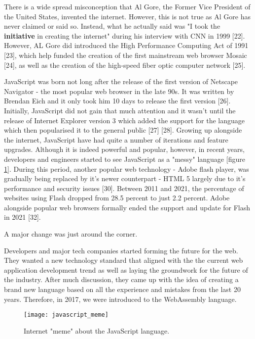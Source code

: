 There is a wide spread misconception that Al Gore, the Former Vice President of the United States, invented the internet. However, this is not true as Al Gore has never claimed or said so. Instead, what he actually said was "I took the \textbf{initiative} in creating the internet" during his interview with CNN in 1999 [22]. However, AL Gore did introduced the High Performance Computing Act of 1991 [23], which help funded the creation of the first mainstream web browser Mosaic [24], as well as the creation of the high-speed fiber optic computer network [25].

JavaScript was born not long after the release of the first version of Netscape Navigator - the most popular web browser in the late 90s. It was written by Brendan Eich and it only took him 10 days to release the first version [26]. Initially, JavaScript did not gain that much attention and it wasn't until the release of Internet Explorer version 3 which added the support for the language which then popularised it to the general public [27] [28]. Growing up alongside the internet, JavaScript have had quite a number of iterations and feature upgrades. Although it is indeed powerful and popular, however, in recent years, developers and engineers started to see JavaScript as a "messy" language [figure \ref{fig:javascript_meme}]. During this period, another popular web technology - Adobe flash player, was gradually being replaced by it's newer counterpart - HTML 5 largely due to it's performance and security issues [30]. Between 2011 and 2021, the percentage of websites using Flash dropped from 28.5 percent to just 2.2 percent. Adobe alongside popular web browsers formally ended the support and update for Flash in 2021 [32].

A major change was just around the corner.

Developers and major tech companies started forming the future for the web. They wanted a new technology standard that aligned with the the current web application development trend as well as laying the groundwork for the future of the industry. After much discussion, they came up with the idea of creating a brand new language based on all the experience and mistakes from the last 20 years. Therefore, in 2017, we were introduced to the WebAssembly language.

\newpage

\begin{figure}[hp]
\centering
\texttt{[image: javascript\_meme]}
\caption{\footnotesize{Internet "meme" about the JavaScript language.}}
\captionsetup{aboveskip=0pt,font=it}
\label{fig:javascript_meme}
\end{figure}

